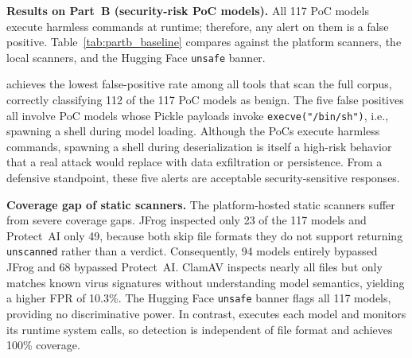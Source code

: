 \noindent \textbf{Results on Part~B (security-risk PoC models).} All 117 PoC models execute harmless commands at runtime; therefore, any alert on them is a false positive. Table~\ref{tab:partb_baseline} compares \toolname{} against the platform scanners, the local scanners, and the Hugging Face \texttt{unsafe} banner.

\begin{table}[t!]
    \scriptsize
    \centering
    \caption{False-positive evaluation on the 117 Part~B PoC models.}
    \label{tab:partb_baseline}
\end{table}

\toolname{} achieves the lowest false-positive rate among all tools that scan the full corpus, correctly classifying 112 of the 117 PoC models as benign. The five false positives all involve PoC models whose Pickle payloads invoke \texttt{execve("/bin/sh")}, i.e., spawning a shell during model loading. Although the PoCs execute harmless commands, spawning a shell during deserialization is itself a high-risk behavior that a real attack would replace with data exfiltration or persistence. From a defensive standpoint, these five alerts are acceptable security-sensitive responses.

\noindent \textbf{Coverage gap of static scanners.} The platform-hosted static scanners suffer from severe coverage gaps. JFrog inspected only 23 of the 117 models and Protect~AI only 49, because both skip file formats they do not support returning \texttt{unscanned} rather than a verdict. Consequently, 94 models entirely bypassed JFrog and 68 bypassed Protect~AI. ClamAV inspects nearly all files  but only matches known virus signatures without understanding model semantics, yielding a higher FPR of 10.3\%. The Hugging Face \texttt{unsafe} banner flags all 117 models, providing no discriminative power. In contrast, \toolname{} executes each model and monitors its runtime system calls, so detection is independent of file format and achieves 100\% coverage.

